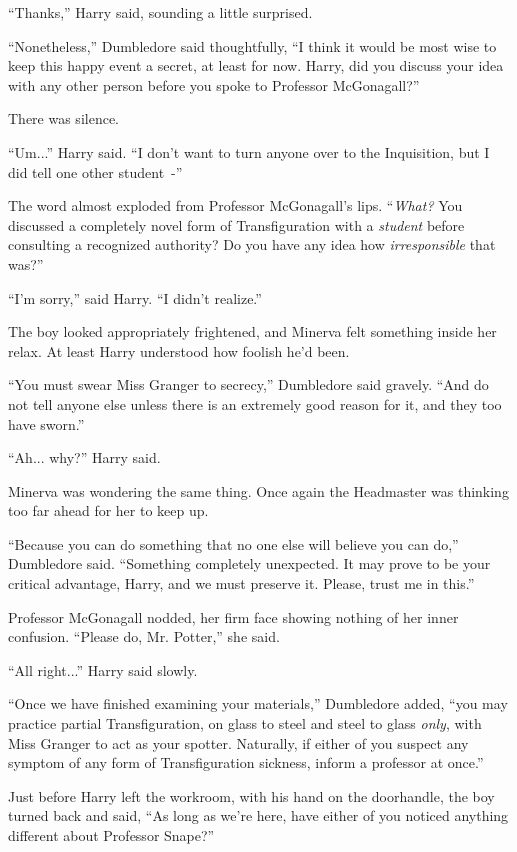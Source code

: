 ``Thanks,'' Harry said, sounding a little surprised.

``Nonetheless,'' Dumbledore said thoughtfully, ``I think it would be most wise to keep this happy event a secret, at least for now. Harry, did you discuss your idea with any other person before you spoke to Professor McGonagall?''

There was silence.

``Um...'' Harry said. ``I don't want to turn anyone over to the Inquisition, but I did tell one other student~-''

The word almost exploded from Professor McGonagall's lips. ``\emph{What?} You discussed a completely novel form of Transfiguration with a \emph{student} before consulting a recognized authority? Do you have any idea how \emph{irresponsible} that was?''

``I'm sorry,'' said Harry. ``I didn't realize.''

The boy looked appropriately frightened, and Minerva felt something inside her relax. At least Harry understood how foolish he'd been.

``You must swear Miss Granger to secrecy,'' Dumbledore said gravely. ``And do not tell anyone else unless there is an extremely good reason for it, and they too have sworn.''

``Ah... why?'' Harry said.

Minerva was wondering the same thing. Once again the Headmaster was thinking too far ahead for her to keep up.

``Because you can do something that no one else will believe you can do,'' Dumbledore said. ``Something completely unexpected. It may prove to be your critical advantage, Harry, and we must preserve it. Please, trust me in this.''

Professor McGonagall nodded, her firm face showing nothing of her inner confusion. ``Please do, Mr. Potter,'' she said.

``All right...'' Harry said slowly.

``Once we have finished examining your materials,'' Dumbledore added, ``you may practice partial Transfiguration, on glass to steel and steel to glass \emph{only}, with Miss Granger to act as your spotter. Naturally, if either of you suspect any symptom of any form of Transfiguration sickness, inform a professor at once.''

Just before Harry left the workroom, with his hand on the doorhandle, the boy turned back and said, ``As long as we're here, have either of you noticed anything different about Professor Snape?''

